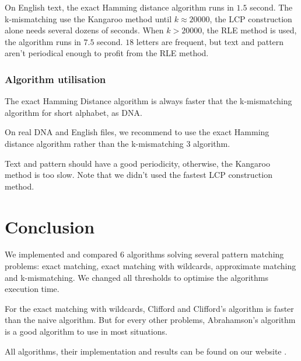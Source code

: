\documentclass[preprint,12pt]{elsarticle}
\begin{document}
On English text, the exact Hamming distance algorithm runs in $1.5$ second.
The k-mismatching use the Kangaroo method until $k \approx 20000$,
the LCP construction alone needs several dozens of seconds.
When $k>20000$, the RLE method is used, the algorithm runs in $7.5$ second.
$18$ letters are frequent, but text and pattern aren't periodical enough to profit from the RLE method.



\subsubsection*{Algorithm utilisation}

The exact Hamming Distance algorithm is always faster that the k-mismatching algorithm for short alphabet, as DNA.

On real DNA and English files,
we recommend to use the exact Hamming distance algorithm rather than the k-mismatching $3$ algorithm.

Text and pattern should have a good periodicity, otherwise, the Kangaroo method is too slow.
Note that we didn't used the fastest LCP construction method.








\section*{Conclusion}

We implemented and compared $6$ algorithms solving several pattern matching problems: 
exact matching, exact matching with wildcards, approximate matching and k-mismatching.
We changed all thresholds to optimise the algorithms execution time.

For the exact matching with wildcards, Clifford and Clifford's \cite{WC} algorithm is faster than the naive algorithm.
But for every other problems, Abrahamson's algorithm \cite{ExactHD} is a good algorithm to use
in most situations.









All algorithms, their implementation and results can be found on our website \cite{stringipedia}.
\end{document}
